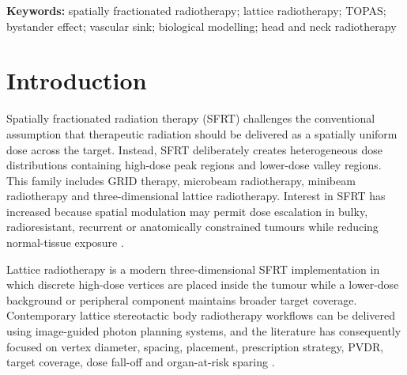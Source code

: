 \documentclass[10pt,a4paper]{article}
\begin{document}
\begin{abstract}
\textbf{Significance.} This work should be interpreted as a hypothesis-generating computational risk-analysis framework rather than as a validated clinical toxicity predictor or treatment-planning optimizer. It provides a reproducible method for testing whether physically acceptable lattice dose patterns may acquire different biological interpretations once non-local signalling is introduced, while suggesting that anatomy-aware vascular uptake acts mainly as a secondary spatial modifier. Translation will require patient-derived RTDOSE/RTSTRUCT data, realistic vascular segmentation, and experimental spatially fractionated assay validation before any clinical decision-support use.
\end{abstract}

\textbf{Keywords:} spatially fractionated radiotherapy; lattice radiotherapy; TOPAS; bystander effect; vascular sink; biological modelling; head and neck radiotherapy

\section{Introduction}
Spatially fractionated radiation therapy (SFRT) challenges the conventional assumption that therapeutic radiation should be delivered as a spatially uniform dose across the target. Instead, SFRT deliberately creates heterogeneous dose distributions containing high-dose peak regions and lower-dose valley regions. This family includes GRID therapy, microbeam radiotherapy, minibeam radiotherapy and three-dimensional lattice radiotherapy. Interest in SFRT has increased because spatial modulation may permit dose escalation in bulky, radioresistant, recurrent or anatomically constrained tumours while reducing normal-tissue exposure \cite{prezado2024critical,prezado2022divide,fernandez2022peak}.

Lattice radiotherapy is a modern three-dimensional SFRT implementation in which discrete high-dose vertices are placed inside the tumour while a lower-dose background or peripheral component maintains broader target coverage. Contemporary lattice stereotactic body radiotherapy workflows can be delivered using image-guided photon planning systems, and the literature has consequently focused on vertex diameter, spacing, placement, prescription strategy, PVDR, target coverage, dose fall-off and organ-at-risk sparing \cite{duriseti2021lattice,kavanaugh2022planning,duriseti2022phase,grams2023clinical,iori2023lattice,zhang2023lattice,botti2024latticeopt,yang2022feasibility}.
\end{document}
